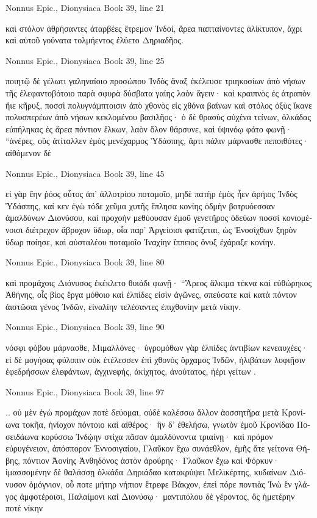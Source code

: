 \documentclass[12pt,letterpaper,twoside,final]{memoir}
\begin{document}
\begin{greek}
Nonnus Epic., Dionysiaca 
Book 39, line 21

καὶ στόλον ἀθρήσαντες ἀταρβέες ἔτρεμον Ἰνδοί, 
ἄρεα παπταίνοντες ἁλίκτυπον, ἄχρι καὶ αὐτοῦ 
γούνατα τολμήεντος ἐλύετο Δηριαδῆος. 



Nonnus Epic., Dionysiaca 
Book 39, line 25

ποιητῷ δὲ γέλωτι γαληναίοιο προσώπου 
Ἰνδὸς ἄναξ ἐκέλευσε τριηκοσίων ἀπὸ νήσων 
τῆς ἐλεφαντοβότοιο παρὰ σφυρὰ δύσβατα γαίης 
λαὸν ἄγειν· καὶ κραιπνὸς ἐς ἀτραπὸν ἤιε κῆρυξ, 
ποσσὶ πολυγνάμπτοισιν ἀπὸ χθονὸς εἰς χθόνα βαίνων 
καὶ στόλος ὀξὺς ἵκανε πολυσπερέων ἀπὸ νήσων 
κεκλομένου βασιλῆος· ὁ δὲ θρασὺς αὐχένα τείνων, 
ὁλκάδας εὐπήληκας ἐς ἄρεα πόντιον ἕλκων, 
λαὸν ὅλον θάρσυνε, καὶ ὑψινόῳ φάτο φωνῇ· 
 “ἀνέρες, οὓς ἀτίταλλεν ἐμὸς μενέχαρμος Ὑδάσπης, 
ἄρτι πάλιν μάρνασθε πεποιθότες· αἰθόμενον δὲ 




Nonnus Epic., Dionysiaca 
Book 39, line 45

εἰ γὰρ ἔην ῥόος οὗτος ἀπ' ἀλλοτρίου ποταμοῖο, 
μηδὲ πατὴρ ἐμὸς ἦεν ἀρήιος Ἰνδὸς Ὑδάσπης, 
καί κεν ἐγὼ τόδε χεῦμα χυτῆς ἔπλησα κονίης 
ὀδμὴν βοτρυόεσσαν ἀμαλδύνων Διονύσου, 
καὶ προχοὴν μεθύουσαν ἐμοῦ γενετῆρος ὁδεύων 
ποσσὶ κονιομένοισι διέτρεχον ἄβροχον ὕδωρ, 
οἷα παρ' Ἀργείοισι φατίζεται, ὡς Ἐνοσίχθων 
ξηρὸν ὕδωρ ποίησε, καὶ αὐσταλέου ποταμοῖο 
Ἰναχίην ἵππειος ὄνυξ ἐχάραξε κονίην. 



Nonnus Epic., Dionysiaca 
Book 39, line 80


καὶ προμάχοις Διόνυσος ἐκέκλετο θυιάδι φωνῇ· 
 “Ἄρεος ἄλκιμα τέκνα καὶ εὐθώρηκος Ἀθήνης, 
οἷς βίος ἔργα μόθοιο καὶ ἐλπίδες εἰσὶν ἀγῶνες, 
σπεύσατε καὶ κατὰ πόντον ἀιστῶσαι γένος Ἰνδῶν, 
εἰναλίην τελέσαντες ἐπιχθονίην μετὰ νίκην. 



Nonnus Epic., Dionysiaca 
Book 39, line 90

νόσφι φόβου μάρνασθε, Μιμαλλόνες· ὑγρομόθων γὰρ 
ἐλπίδες ἀντιβίων κενεαυχέες· εἰ δὲ μογήσας 
φύλοπιν οὐκ ἐτέλεσσεν ἐπὶ χθονὸς ὄρχαμος Ἰνδῶν, 
ἠλιβάτων λοφιῇσιν ἐφεδρήσσων ἐλεφάντων, 
ἀγχινεφής, ἀκίχητος, ἀνούτατος, ἠέρι γείτων . 



Nonnus Epic., Dionysiaca 
Book 39, line 97

                                                      .. 
οὐ μὲν ἐγὼ προμάχων ποτὲ δεύομαι, οὐδὲ καλέσσω 
ἄλλον ἀοσσητῆρα μετὰ Κρονίωνα τοκῆα, 
ἡνίοχον πόντοιο καὶ αἰθέρος· ἢν δ' ἐθελήσω, 
γνωτὸν ἐμοῦ Κρονίδαο Ποσειδάωνα κορύσσω 
Ἰνδῴην στίχα πᾶσαν ἀμαλδύνοντα τριαίνῃ· 
καὶ πρόμον εὐρυγένειον, ἀπόσπορον Ἐννοσιγαίου, 
Γλαῦκον ἔχω συνάεθλον, ἐμῆς ἅτε γείτονα Θήβης, 
πόντιον Ἀονίης Ἀνθηδόνος ἀστὸν ἀρούρης· 
Γλαῦκον ἔχω καὶ Φόρκυν· ἱμασσομένην δὲ θαλάσσῃ 
ὁλκάδα Δηριάδαο κατακρύψει Μελικέρτης, 
κυδαίνων Διόνυσον ὁμόγνιον, οὗ ποτε μήτηρ 
νήπιον ἔτρεφε Βάκχον, ἐπεὶ πόρε ποντιὰς Ἰνὼ 
ἓν γλάγος ἀμφοτέροισι, Παλαίμονι καὶ Διονύσῳ· 
μαντιπόλου δὲ γέροντος, ὃς ἡμετέρην ποτὲ νίκην 





\end{greek}
\end{document}

